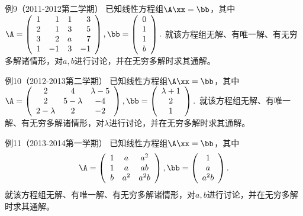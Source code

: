 \begin{frame}\ft{\subsecname}
  \begin{scriptsize}
    \begin{exampleblock}{例9（2011-2012第二学期）}
    已知线性方程组$\A\xx=\bb$，其中$\A=\left(
    \begin{array}{rrrr}
        1&1&1&3\\
        2&1&3&5\\
        3&2&a&7\\
        1&-1&3&-1
      \end{array}
    \right),\bb=\left(
      \begin{array}{c}
        0\\1\\1\\b
      \end{array}
      \right).$
      就该方程组无解、有唯一解、有无穷多解诸情形，对$a,b$进行讨论，并在无穷多解时求其通解。
    \end{exampleblock}

    \begin{exampleblock}{例10（2012-2013第二学期）}
    已知线性方程组$\A\xx=\bb$，其中$\A=\left(
    \begin{array}{ccc}
        2&4&\lambda-5\\
        2&5-\lambda&-4\\
        2-\lambda&2&-2
      \end{array}
    \right),\bb=\left(
      \begin{array}{c}
        \lambda+1\\2\\1
      \end{array}
      \right).$
     就该方程组无解、有唯一解、有无穷多解诸情形，对$\lambda$进行讨论，并在无穷多解时求其通解。         \end{exampleblock}

\end{scriptsize}
\end{frame}


\begin{frame}\ft{\subsecname}
  \begin{scriptsize}
    \begin{exampleblock}{例11（2013-2014第一学期）}
    已知线性方程组$\A\xx=\bb$，其中$$\A=\left(
    \begin{array}{ccc}
        1&a&a^2\\
        1&a&ab\\
        b&a^2&a^2b
      \end{array}
    \right),\bb=\left(
      \begin{array}{c}
        1\\a\\a^2b
      \end{array}
      \right).$$
     就该方程组无解、有唯一解、有无穷多解诸情形，对$a,b$进行讨论，并在无穷多解时求其通解。    \end{exampleblock}

  \end{scriptsize}
\end{frame} 



